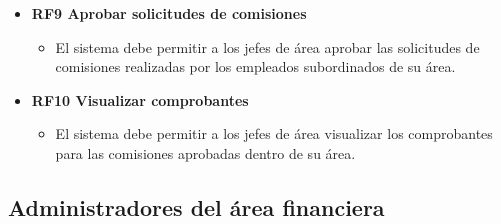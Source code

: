 \begin{itemize}
	\item \textbf{RF9 Aprobar solicitudes de comisiones}
	\begin{itemize}
		\item El sistema debe permitir a los jefes de área aprobar las solicitudes de comisiones realizadas por los empleados subordinados de su área.
	\end{itemize}

	\item \textbf{RF10 Visualizar comprobantes}
	\begin{itemize}
		\item El sistema debe permitir a los jefes de área visualizar los comprobantes para las comisiones aprobadas dentro de su área.
	\end{itemize}
\end{itemize}

\subsection{Administradores del área financiera}


